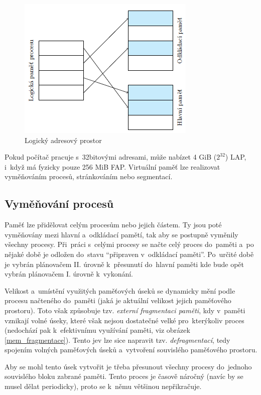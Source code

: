 \begin{figure}[ht]
	\centering
	\includegraphics[scale=1]{images/mem_lap.png}
	\caption{Logický adresový prostor}
	\label{mem_lap}
\end{figure}

Pokud počítač pracuje s~32bitovými adresami, může nabízet 4 GiB ($2^{32}$) LAP, i~když má fyzicky pouze 256 MiB FAP. Virtuální paměť lze realizovat vyměňováním procesů, stránkováním nebo segmentací.

\subsection{Vyměňování procesů}

Paměť lze přidělovat celým procesům nebo jejich částem. Ty jsou poté vyměňovány mezi hlavní a~odkládací pamětí, tak aby se postupně vyměnily všechny procesy. Při~práci s~celými procesy se načte celý proces do~paměti a~po nějaké době je odložen do~stavu \enquote{připraven v~odkládací paměti}. Po~určité době je vybrán plánovačem II. úrovně k~přesunutí do~hlavní paměti kde bude opět vybrán plánovačem I. úrovně k~vykonání.

Velikost a~umístění využitých paměťových úseků se dynamicky mění podle procesu načteného do~paměti (jaká je aktuální velikost jejich paměťového prostoru). Toto však způsobuje tzv. \emph{externí fragmentaci paměti}, kdy v~paměti vznikají volné úseky, které však nejsou dostatečné velké pro~kterýkoliv proces (nedochází pak k~efektivnímu využívání paměti, viz obrázek \ref{mem_fragmentace}). Tento jev lze sice napravit tzv. \emph{defragmentací}, tedy spojením volných paměťových úseků a~vytvoření souvislého paměťového prostoru.

Aby se mohl tento úsek vytvořit je třeba přesunout všechny procesy do~jednoho souvislého bloku zabrané paměti. Tento proces je časově náročný (navíc by se musel dělat periodicky), proto se k~němu většinou nepřikračuje.

